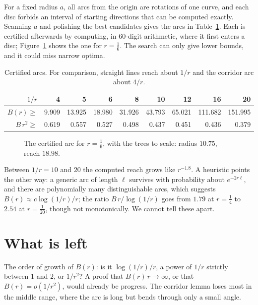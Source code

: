 \documentclass[11pt]{article}
\begin{document}
For a fixed radius $a$, all arcs from the origin are rotations of one curve, and each disc forbids an interval of
starting directions that can be computed exactly. Scanning $a$ and polishing the best candidates gives the arcs in
Table~\ref{tab:arcs}. Each is certified afterwards by computing, in $60$-digit arithmetic, where it first enters a
disc; Figure~\ref{fig:best} shows the one for $r=\frac16$. The search can only give lower bounds, and it could miss
narrow optima.

\begin{table}[ht]
\centering
\begin{tabular}{rrrrrrrrr}
\toprule
$1/r$ & 4 & 5 & 6 & 8 & 10 & 12 & 16 & 20 \\
\midrule
$B(r)\ge$ & 9.909 & 13.925 & 18.980 & 31.926 & 43.793 & 65.021 & 111.682 & 151.995 \\
$B\,r^2\ge$ & 0.619 & 0.557 & 0.527 & 0.498 & 0.437 & 0.451 & 0.436 & 0.379 \\
\bottomrule
\end{tabular}
\caption{Certified arcs. For comparison, straight lines reach about $1/r$ and the corridor arc about $4/r$.}
\label{tab:arcs}
\end{table}

\begin{figure}[ht]
\centering

\caption{The certified arc for $r=\frac16$, with the trees to scale: radius $10.75$, reach $18.98$.}
\label{fig:best}
\end{figure}

Between $1/r=10$ and $20$ the computed reach grows like $r^{-1.8}$. A heuristic points the other way: a generic arc of
length $\ell$ survives with probability about $e^{-2r\ell}$, and there are polynomially many distinguishable arcs, which
suggests $B(r)\approx c\log(1/r)/r$; the ratio $B\,r/\log(1/r)$ goes from $1.79$ at $r=\frac14$ to $2.54$ at
$r=\frac1{20}$, though not monotonically. We cannot tell these apart.

\section{What is left}

The order of growth of $B(r)$: is it $\log(1/r)/r$, a power of $1/r$ strictly between $1$ and $2$, or $1/r^2$? A proof
that $B(r)\,r\to\infty$, or that $B(r)=o(1/r^2)$, would already be progress. The corridor lemma loses most in the
middle range, where the arc is long but bends through only a small angle.
\end{document}
